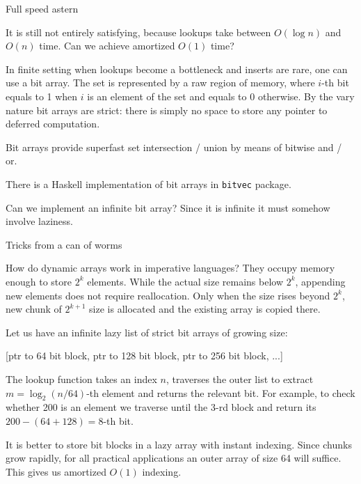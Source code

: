 \documentclass[handout]{beamer}
\begin{document}
\begin{frame}{Full speed astern}

It is still not entirely satisfying, because lookups take
between $O(\log n)$ and $O(n)$ time.
Can we achieve amortized $O(1)$ time?

\bigskip

\pause
In finite setting when lookups become a bottleneck and inserts are rare,
one can use a bit array. The set is represented by a raw region of memory,
where $i$-th bit equals to 1 when $i$ is an element of the set and equals to 0
otherwise. By the vary nature bit arrays are strict: there is simply no space
to store any pointer to deferred computation.

\bigskip

\pause
Bit arrays provide superfast set intersection / union
by means of bitwise and / or.

\bigskip

\pause
There is a Haskell implementation of bit arrays in {\tt bitvec} package.

\bigskip

\pause
Can we implement an infinite bit array? Since it is infinite
it must somehow involve laziness.

\end{frame}

\begin{frame}{Tricks from a can of worms}

How do dynamic arrays
work in imperative languages? They occupy memory
enough to store $2^k$ elements. While the actual size remains below
$2^k$, appending new elements does not require reallocation.
Only when the size rises beyond $2^k$, new chunk of $2^{k+1}$ size
is allocated and the existing array is copied there.

\bigskip

\pause

Let us have an infinite lazy list of strict bit arrays of growing size:

[ptr to 64 bit block, ptr to 128 bit block, ptr to 256 bit block, ...]

\bigskip

\pause
The lookup function takes an index $n$,
traverses the outer list to extract $m = \log_2 (n/64)$-th element
and returns the relevant bit. For example, to check whether 200 is an
element we traverse until the 3-rd block
and return its $200-(64+128) = 8$-th bit.

\bigskip

\pause
It is better to store bit blocks in a lazy array with instant indexing.
Since chunks grow rapidly, for all practical applications
an outer array of size 64 will suffice. This gives us amortized $O(1)$ indexing.

\end{frame}
\end{document}
